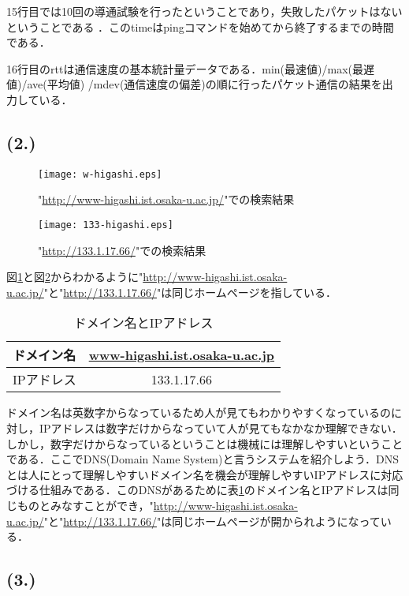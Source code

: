 \documentclass[a4j]{jarticle}
\newenvironment{tab}{\begin{table}}{\end{table}} %
\newenvironment{tabu}{\begin{tabular}}{\end{tabular}} %
\begin{document}
15行目では10回の導通試験を行ったということであり，失敗したパケットはないということである
．このtimeはpingコマンドを始めてから終了するまでの時間である．

16行目のrttは通信速度の基本統計量データである．min(最速値)/max(最遅値)/ave(平均値)
/mdev(通信速度の偏差)の順に行ったパケット通信の結果を出力している．

\subsection{(2.)}

\begin{figure}[htb]
\centering
\texttt{[image: w-higashi.eps]}
\caption{"\url{http://www-higashi.ist.osaka-u.ac.jp/}"での検索結果}
\label{fig:www}
\end{figure}

\begin{figure}[htb]
\centering
\texttt{[image: 133-higashi.eps]}
\caption{"\url{http://133.1.17.66/}"での検索結果}
\label{fig:133}
\end{figure}

図\ref{fig:www}と図\ref{fig:133}からわかるように"\url{http://www-higashi.ist.osaka-u.ac.jp/}"と"\url{http://133.1.17.66/}"は同じホームページを指している．

\begin{tab}[H]
\centering
\begin{tabu}{|c|c|}
\hline
ドメイン名 & \url{www-higashi.ist.osaka-u.ac.jp} \\
\hline
IPアドレス & 133.1.17.66 \\
\hline
\end{tabu}
\caption{ドメイン名とIPアドレス}
\label{tab:ip}
\end{tab}

ドメイン名は英数字からなっているため人が見てもわかりやすくなっているのに対し，IPアドレスは数字だけからなっていて人が見てもなかなか理解できない．しかし，数字だけからなっているということは機械には理解しやすいということである．ここでDNS(Domain Name System)と言うシステムを紹介しよう．DNSとは人にとって理解しやすいドメイン名を機会が理解しやすいIPアドレスに対応づける仕組みである．このDNSがあるために表\ref{tab:ip}のドメイン名とIPアドレスは同じものとみなすことができ，"\url{http://www-higashi.ist.osaka-u.ac.jp/}"と"\url{http://133.1.17.66/}"は同じホームページが開かられようになっている．

\subsection{(3.)}
\end{document}
